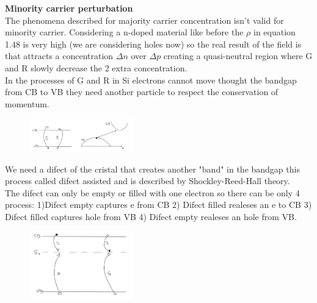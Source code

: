 {\bf Minority carrier perturbation}\\
The phenomena described for majority carrier concentration isn't valid for minority carrier. Considering a n-doped material like before the $\rho$ in equation 1.48 is very high (we are considering holes now) so the real result of the field is that attracts a concentration $\Delta n$ over $\Delta p$ creating a quasi-neutral region where G and R slowly decrease the 2 extra concentration.\\
In the processes of G and R in Si electrons cannot move thought the bandgap from CB to VB they need another particle to respect the conservation of momentum.\\

\begin{figure}
\includegraphics[width=0.4\textwidth]{srhp1.png}
\end{figure}

We need a difect of the cristal that creates another "band" in the bandgap this process called difect assisted and is described by Shockley-Reed-Hall theory.\\
The difect can only be empty or filled with one electron so there can be only 4 process: 1)Difect empty captures e from CB   2) Difect filled realeses an e to CB 3) Difect filled captures hole from VB 4) Difect empty realeses an hole from VB.

\begin{figure}
\includegraphics[width=0.4\textwidth]{srhp2.png}
\end{figure}

